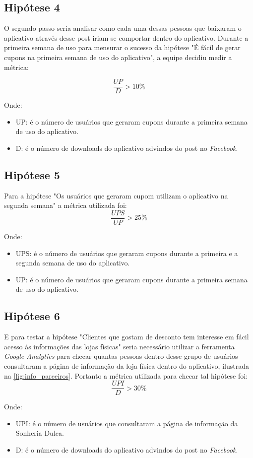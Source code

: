 \subsection{Hipótese 4}
\label{cha:hip_4}
O segundo passo seria analisar como cada uma dessas pessoas que baixaram o aplicativo através desse post iriam se comportar dentro do aplicativo. Durante a primeira semana de uso para mensurar o sucesso da hipótese "É fácil de gerar cupons na primeira semana de uso do aplicativo", a equipe decidiu medir a métrica:

\[\dfrac{UP}{D} > 10\%\]

Onde: 
\begin{itemize}
\item UP: é o número de usuários que geraram cupons durante a primeira semana de uso do aplicativo.
\item D: é o número de downloads do aplicativo advindos do post no \textit{Facebook}.
\end{itemize}

\subsection{Hipótese 5}
\label{cha:hip_5}
Para a hipótese "Os usuários que geraram cupom utilizam o aplicativo na segunda semana" a métrica utilizada foi:
\[\dfrac{UPS}{UP} > 25\%\]

Onde: 
\begin{itemize}
\item UPS: é o número de usuários que geraram cupons durante a primeira e a segunda semana de uso do aplicativo.
\item UP: é o número de usuários que geraram cupons durante a primeira semana de uso do aplicativo.
\end{itemize}

\subsection{Hipótese 6}
\label{cha:hip_6}
E para testar a hipótese "Clientes que gostam de desconto tem interesse em fácil acesso às informações das lojas físicas" seria necessário utilizar a ferramenta \textit{Google Analytics} para checar quantas pessoas dentro desse grupo de usuários consultaram a página de informação da loja física dentro do aplicativo, ilustrada na \autoref{fig:info_parceiros}. Portanto a métrica utilizada para checar tal hipótese foi:
\[\dfrac{UPI}{D} > 30\%\]

Onde: 
\begin{itemize}
\item UPI: é o número de usuários que consultaram a página de informação da Sonheria Dulca.
\item D: é o número de downloads do aplicativo advindos do post no \textit{Facebook}.
\end{itemize}

